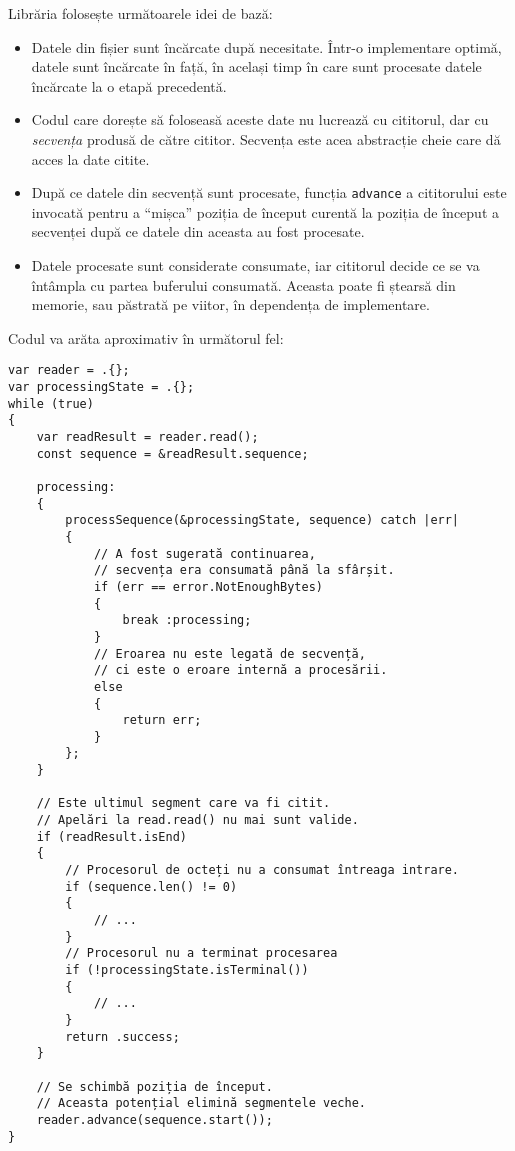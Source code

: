 \documentclass[a4paper,12pt]{report}
\begin{document}
Librăria folosește următoarele idei de bază:
\begin{itemize}
    \item 
        Datele din fișier sunt încărcate după necesitate.
        Într-o implementare optimă, datele sunt încărcate în față, în același timp în care sunt procesate
        datele încărcate la o etapă precedentă.

    \item
        Codul care dorește să foloseasă aceste date nu lucrează cu cititorul,
        dar cu \textit{secvența} produsă de către cititor.
        Secvența este acea abstracție cheie care dă acces la date citite.

    \item
        După ce datele din secvență sunt procesate,
        funcția \texttt{advance} a cititorului este invocată pentru
        a ``mișca'' poziția de început curentă la poziția de început 
        a secvenței după ce datele din aceasta au fost procesate.

    \item
        Datele procesate sunt considerate consumate,
        iar cititorul decide ce se va întâmpla cu partea buferului consumată.
        Aceasta poate fi ștearsă din memorie, sau păstrată pe viitor, în dependența de implementare.
\end{itemize}

Codul va arăta aproximativ în următorul fel:

\begin{verbatim}
var reader = .{};
var processingState = .{};
while (true)
{
    var readResult = reader.read();
    const sequence = &readResult.sequence;

    processing:
    {
        processSequence(&processingState, sequence) catch |err|
        {
            // A fost sugerată continuarea,
            // secvența era consumată până la sfârșit.
            if (err == error.NotEnoughBytes)
            {
                break :processing;
            }
            // Eroarea nu este legată de secvență,
            // ci este o eroare internă a procesării.
            else
            {
                return err;
            }
        };
    }

    // Este ultimul segment care va fi citit.
    // Apelări la read.read() nu mai sunt valide.
    if (readResult.isEnd)
    {
        // Procesorul de octeți nu a consumat întreaga intrare.
        if (sequence.len() != 0)
        {
            // ...
        }
        // Procesorul nu a terminat procesarea
        if (!processingState.isTerminal())
        {
            // ...
        }
        return .success;
    }

    // Se schimbă poziția de început.
    // Aceasta potențial elimină segmentele veche.
    reader.advance(sequence.start());
}
\end{verbatim}
\end{document}
